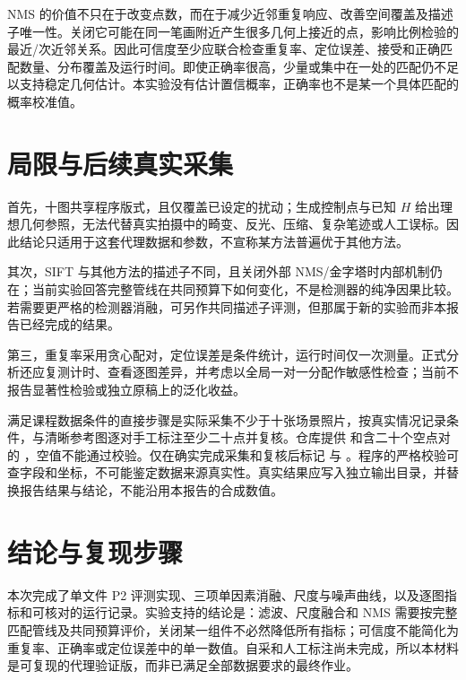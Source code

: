 NMS 的价值不只在于改变点数，而在于减少近邻重复响应、改善空间覆盖及描述子唯一性。关闭它可能在同一笔画附近产生很多几何上接近的点，影响比例检验的最近/次近邻关系。因此可信度至少应联合检查重复率、定位误差、接受和正确匹配数量、分布覆盖及运行时间。即使正确率很高，少量或集中在一处的匹配仍不足以支持稳定几何估计。本实验没有估计置信概率，正确率也不是某一个具体匹配的概率校准值。

\section{局限与后续真实采集}
首先，十图共享程序版式，且仅覆盖已设定的扰动；生成控制点与已知 $H$ 给出理想几何参照，无法代替真实拍摄中的畸变、反光、压缩、复杂笔迹或人工误标。因此结论只适用于这套代理数据和参数，不宣称某方法普遍优于其他方法。

其次，SIFT 与其他方法的描述子不同，且关闭外部 NMS/金字塔时内部机制仍在；当前实验回答完整管线在共同预算下如何变化，不是检测器的纯净因果比较。若需要更严格的检测器消融，可另作共同描述子评测，但那属于新的实验而非本报告已经完成的结果。

第三，重复率采用贪心配对，定位误差是条件统计，运行时间仅一次测量。正式分析还应复测计时、查看逐图差异，并考虑以全局一对一分配作敏感性检查；当前不报告显著性检验或独立原稿上的泛化收益。

满足课程数据条件的直接步骤是实际采集不少于十张场景照片，按真实情况记录条件，与清晰参考图逐对手工标注至少二十点并复核。仓库提供  和含二十个空点对的 ，空值不能通过校验。仅在确实完成采集和复核后标记  与 。程序的严格校验可查字段和坐标，不可能鉴定数据来源真实性。真实结果应写入独立输出目录，并替换报告结果与结论，不能沿用本报告的合成数值。

\section{结论与复现步骤}
本次完成了单文件 P2 评测实现、三项单因素消融、尺度与噪声曲线，以及逐图指标和可核对的运行记录。实验支持的结论是：滤波、尺度融合和 NMS 需要按完整匹配管线及共同预算评价，关闭某一组件不必然降低所有指标；可信度不能简化为重复率、正确率或定位误差中的单一数值。自采和人工标注尚未完成，所以本材料是可复现的代理验证版，而非已满足全部数据要求的最终作业。

